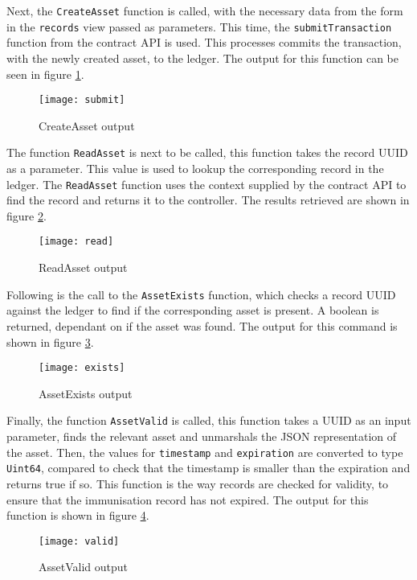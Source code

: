 Next, the \lstinline{CreateAsset} function is called, with the necessary data from the form in the \lstinline{records} view passed as parameters. 
This time, the \lstinline{submitTransaction} function from the contract API is used. 
This processes commits the transaction, with the newly created asset, to the ledger. 
The output for this function can be seen in figure \ref{fig:submit}.

\begin{figure}[H]
  \texttt{[image: submit]}
  \caption{CreateAsset output}
  \label{fig:submit}
\end{figure}

The function \lstinline{ReadAsset} is next to be called, this function takes the record UUID as a parameter. 
This value is used to lookup the corresponding record in the ledger. 
The \lstinline{ReadAsset} function uses the context supplied by the contract API to find the record and returns it to the controller.
The results retrieved are shown in figure \ref{fig:read}.

\begin{figure}[H]
  \texttt{[image: read]}
  \caption{ReadAsset output}
  \label{fig:read}
\end{figure}

Following is the call to the \lstinline{AssetExists} function, which checks a record UUID against the ledger to find if the corresponding asset is present. 
A boolean is returned, dependant on if the asset was found. 
The output for this command is shown in figure \ref{fig:exists}. 

\begin{figure}[H]
  \texttt{[image: exists]}
  \caption{AssetExists output}
  \label{fig:exists}
\end{figure}

Finally, the function \lstinline{AssetValid} is called, this function takes a UUID as an input parameter, finds the relevant asset and unmarshals the JSON representation of the asset. 
Then, the values for \lstinline{timestamp} and \lstinline{expiration} are converted to type \lstinline{Uint64}, compared to check that the timestamp is smaller than the expiration and returns true if so.
This function is the way records are checked for validity, to ensure that the immunisation record has not expired.
The output for this function is shown in figure \ref{fig:valid}.

\begin{figure}[H]
  \texttt{[image: valid]}
  \caption{AssetValid output}
  \label{fig:valid}
\end{figure}

